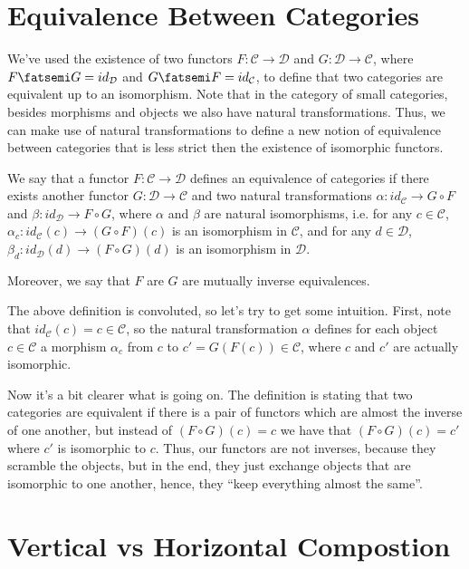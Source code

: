 \section{Equivalence Between Categories}

We've used the existence of two functors $F:\mathcal C \to \mathcal D$ and $G:\mathcal D \to \mathcal C$,
where $F \fatsemi G = id_\mathcal D$ and $G \fatsemi F = id_\mathcal C$,
to define that two categories are equivalent up to an isomorphism.
Note that in the category of small categories, besides morphisms and objects we also
have natural transformations. Thus, we can make use of natural transformations to
define a new notion of equivalence between categories that is less strict then
the existence of isomorphic functors.

\begin{definition}
	We say that a functor $F:\mathcal C \to \mathcal D$ defines an equivalence of
	categories if there exists another functor $G:\mathcal D \to \mathcal C$ and
	two natural transformations
	$\alpha: id_\mathcal C \to G \circ F$ and
	$\beta: id_\mathcal D \to F \circ G$, where $\alpha$ and $\beta$ are natural isomorphisms,
	i.e. for any $c \in \mathcal C$,
	$\alpha_c:id_\mathcal C(c) \to (G \circ F)(c)$ is an
	isomorphism in $\mathcal C$, and for any $d \in \mathcal D$,
	$\beta_d:id_\mathcal D(d) \to (F \circ G)(d)$ is an isomorphism in $\mathcal D$.

	Moreover, we say that $F$ are $G$ are mutually inverse equivalences.
	\label{def:EquivalenceCategories}
\end{definition}

The above definition is convoluted, so let's try to get some intuition.
First, note that $id_\mathcal C(c) = c \in \mathcal C$, so the natural transformation
$\alpha$ defines for each object $c \in \mathcal C$ a morphism $\alpha_c$ from $c$
to $c' = G(F(c)) \in \mathcal C$, where $c$ and $c'$ are actually isomorphic.

Now it's a bit clearer what is going on. The definition is stating that two
categories are equivalent if there is a pair of functors which are almost the inverse
of one another, but instead of $(F \circ G)(c) = c$ we have that
$(F \circ G )(c) = c'$  where $c'$ is isomorphic to $c$.
Thus, our functors are not inverses, because they scramble the objects, but in the end,
they just exchange objects that are isomorphic to one another, hence, they ``keep everything
almost the same''.

\section{Vertical vs Horizontal Compostion}

